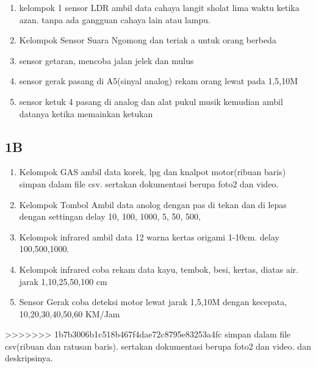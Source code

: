 \begin{enumerate}
\item  kelompok 1 sensor LDR
ambil data cahaya langit sholat lima waktu ketika azan. tanpa ada gangguan cahaya lain atau lampu.

\item Kelompok Sensor Suara
Ngomong dan teriak a untuk orang berbeda

\item sensor getaran, mencoba jalan jelek dan mulus

\item sensor gerak
pasang di A5(sinyal analog) rekam orang lewat pada 1,5,10M


\item sensor ketuk 4
pasang di analog dan alat pukul musik kemudian ambil datanya ketika memainkan ketukan
\end{enumerate}


\subsection{1B}
\begin{enumerate}
\item Kelompok GAS
ambil data korek, lpg dan knalpot motor(ribuan baris) simpan dalam file csv. sertakan dokumentasi berupa foto2 dan video.

\item Kelompok Tombol
Ambil data anolog dengan pas di tekan dan di lepas dengan settingan delay 10, 100, 1000, 5, 50, 500,

\item Kelompok infrared
ambil data 12 warna kertas origami 1-10cm. delay 100,500,1000.

\item Kelompok infrared
coba rekam data kayu, tembok, besi, kertas, diatas air. jarak 1,10,25,50,100 cm 

\item Sensor Gerak
coba deteksi motor lewat jarak 1,5,10M dengan kecepata, 10,20,30,40,50,60 KM/Jam
\end{enumerate}

>>>>>>> 1b7b3006b1c518b467f4dae72c8795e83253a4fc
simpan dalam file csv(ribuan dan ratusan baris). sertakan dokumentasi berupa foto2 dan video. dan deskripsinya.